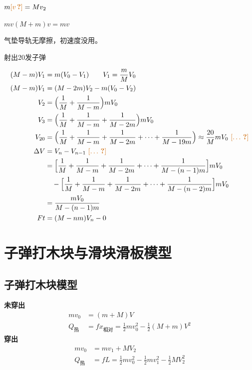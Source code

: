 $m\unclear{v}=Mv_2$

\quad $mv$\quad $(M+m)v=mv$%


\begin{problem}
气垫导轨无摩擦，初速度没用。%

射出20发子弹
\begin{solution}
\begin{align*}
(M-m)V_1&=m(V_0-V_1)\qquad V_1=\frac{m}{M}V_0\\
(M-m)V_1&=(M-2m)V_2-m(V_0-V_2)\\
V_2&=\Bigl(\frac{1}{M}+\frac{1}{M-m}\Bigr)mV_0\\
V_3&=\Bigl(\frac{1}{M}+\frac{1}{M-m}+\frac{1}{M-2m}\Bigr)mV_0\\
V_{20}&=\Bigl(\frac{1}{M}+\frac{1}{M-m}+\frac{1}{M-2m}+\cdots+\frac{1}{M-19m}\Bigr)\approx\frac{20}{M}mV_0\ \text{\unclear{…}}\\
\Delta V&=V_n-V_{n-1}\ \text{\unclear{…}}\\
&=\Bigl[\frac{1}{M}+\frac{1}{M-m}+\frac{1}{M-2m}+\cdots+\frac{1}{M-(n-1)m}\Bigr]mV_0\\
&\quad-\Bigl[\frac{1}{M}+\frac{1}{M-m}+\frac{1}{M-2m}+\cdots+\frac{1}{M-(n-2)m}\Bigr]mV_0\\
&=\frac{mV_0}{M-(n-1)m}\\
Ft&=(M-nm)V_n-0
\end{align*}
\end{solution}
\end{problem}


\section{子弹打木块与滑块滑板模型}
\subsection{子弹打木块模型}
\textbf{未穿出}
\begin{align*}
mv_0&=(m+M)V\\
Q_{\text{热}}&=fx_{\text{相对}}=\tfrac12 mv_0^2-\tfrac12(M+m)V^2
\end{align*}
\textbf{穿出}
\begin{align*}
mv_0&=mv_1+MV_2\\
Q_{\text{热}}&=fL=\tfrac12 mv_0^2-\tfrac12 mv_1^2-\tfrac12 MV_2^2
\end{align*}

